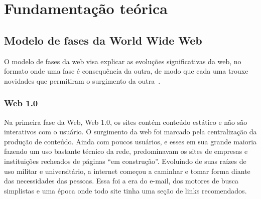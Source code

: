 

\chapter{Fundamentação teórica}

\section{Modelo de fases da World Wide Web}

O modelo de fases da web visa explicar as evoluções significativas da web, no formato onde uma fase é consequência da outra, de modo que cada uma trouxe novidades que permitiram o surgimento da outra~\cite{Web31}.

\subsection{Web 1.0}

Na primeira fase da Web, Web 1.0, os sites contém conteúdo estático e não são interativos com o usuário.
O surgimento da web foi marcado pela centralização da produção de conteúdo. 
Ainda com poucos usuários, e esses em sua grande maioria fazendo um uso bastante técnico da rede, predominavam os sites de empresas e instituições recheados de páginas “em construção”. Evoluindo de suas raízes de uso militar e universitário, a internet começou a caminhar e tomar forma diante das necessidades das pessoas. Essa foi a era do e-mail, dos motores de busca simplistas e uma época onde todo site tinha uma seção de links recomendados.

